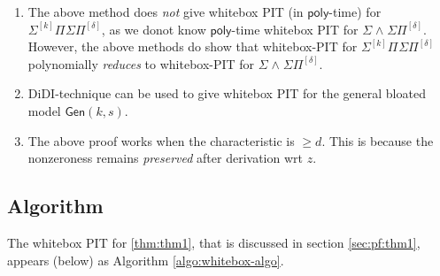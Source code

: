 \documentclass[10pt,a4paper]{article}
\newcommand{\poly}{\mathsf{poly}}
\newcommand{\SPSP}[3]{\Sigma^{#1}\Pi^{#2}\Sigma\Pi^{#3}}
\newcommand{\SWSP}[3]{\Sigma^{#1}\!\wedge^{#2}\!\Sigma\Pi^{#3}}
\newcommand{\Gen}[2]{\mathsf{Gen}(#1,#2)}
\numberwithin{equation}{section}
\begin{document}
\begin{remark*}
\begin{enumerate}
\setlength\itemsep{.1em}
    \item The above method does {\em not} give whitebox PIT (in $\poly$-time) for $\SPSP{[k]}{}{[\delta]}$, as we donot know $\poly$-time whitebox PIT for $\SWSP{}{}{[\delta]}$. However, the above methods do show that whitebox-PIT for $\SPSP{[k]}{}{[\delta]}$ polynomially \emph{reduces} to whitebox-PIT for $\SWSP{}{}{[\delta]}$.
    \item DiDI-technique can be used to give whitebox PIT for the general bloated model $\Gen{k}{s}$. 
    \item The above proof works when the characteristic is $\ge d$. This is because the nonzeroness remains \emph{preserved} after derivation wrt $z$.
\end{enumerate}
\end{remark*}

\subsection{Algorithm}

The whitebox PIT for \autoref{thm:thm1}, that is discussed in section \ref{sec:pf:thm1}, appears (below) as Algorithm \ref{algo:whitebox-algo}.
\end{document}
